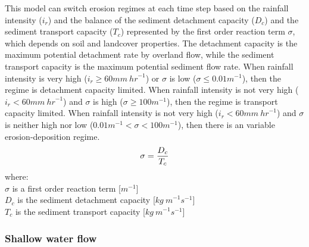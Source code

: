 \documentclass[gmd, manuscript]{copernicus}
\begin{document}
This model can switch erosion regimes at each time step
based on the rainfall intensity ($i_r$)
and the balance of the sediment detachment capacity ($D_c$)
and the sediment transport capacity ($T_c$)
represented by the first order reaction term $\sigma$, 
which depends on soil and landcover properties.
The detachment capacity is the maximum potential 
detachment rate by overland flow, while
the sediment transport capacity 
is the maximum potential sediment flow rate.
When rainfall intensity is very high ($i_r \geq 60 \unit{mm~hr}^{-1}$)
or $\sigma$ is low ($\sigma \leq 0.01 \unit{m}^{-1}$),
then the regime is detachment capacity limited. 
%
When rainfall intensity is not very high ($i_r < 60 \unit{mm~hr}^{-1} $)
and $\sigma$ is high ($\sigma \geq 100 \unit{m}^{-1}$),
then the regime is transport capacity limited. 
%
When rainfall intensity is not very high 
($i_r<60 \unit{mm~hr}^{-1}$)
and $\sigma$ is neither high nor low 
($ 0.01 \unit{m}^{-1}< \sigma < 100 \unit{m}^{-1}$),
then there is an variable erosion-deposition regime. \\
\begin{equation}
\label{eq:regime}
\sigma = {D_c \over T_c}
\end{equation}
{\small
\noindent
where: \\
\noindent
\hspace*{0.5em} $\sigma$  is a first order reaction term [$\unit{m}^{-1}$]\\
\hspace*{0.5em} $D_c$ is the sediment detachment capacity [$\unit{kg~m}^{-1}s^{-1}$]\\
\hspace*{0.5em} $T_c$ is the sediment transport capacity [$\unit{kg~m}^{-1}s^{-1}$]\\
}


\subsubsection{Shallow water flow}
\end{document}
